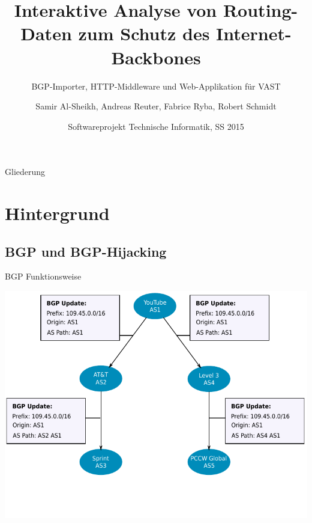 \documentclass[9pt]{beamer}
\title[Softwareprojekt SS2015]{Interaktive Analyse von Routing-Daten zum Schutz des Internet-Backbones}
\subtitle{BGP-Importer, HTTP-Middleware und Web-Applikation für VAST}
\author[Samir, Andreas, Fabrice, Robert]{Samir Al-Sheikh, Andreas Reuter, Fabrice Ryba, Robert Schmidt}
\institute[FU Berlin]{Freie Universität Berlin}
\date[]{Softwareprojekt Technische Informatik, SS 2015}
\begin{document}
\begin{frame}
    \titlepage
\end{frame}

\begin{frame}{Gliederung}
  \tableofcontents
\end{frame}


\section{Hintergrund}

\subsection{BGP und BGP-Hijacking}

\begin{frame}{BGP Funktionsweise}{}
	\begin{center}
		\includegraphics[width=1.0\textwidth]{res/bgp_propagation.pdf}
	\end{center}
\end{frame}
\end{document}
